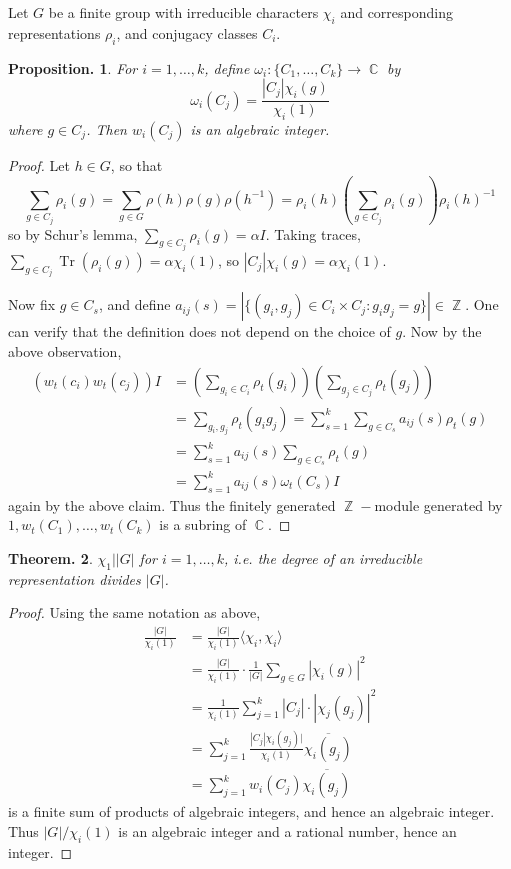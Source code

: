 \documentclass[11pt, a4paper]{memoir}
\DeclareMathOperator{\Z}{{\mathbb{Z}}}
\DeclareMathOperator{\C}{{\mathbb{C}}}
\theoremstyle{change}
\newtheorem{theorem}{Theorem.}[section]
\newtheorem{proposition}[theorem]{Proposition.}
\theoremstyle{plain}
\theoremstyle{nonumberplain}
\newtheorem{proof}{Proof}
\DeclareMathOperator{\Tr}{Tr}
\numberwithin{equation}{section}
\begin{document}
Let $G$ be a finite group with irreducible characters $\chi_i$ and corresponding representations $\rho_i$, and conjugacy classes $C_i$.
\begin{proposition}
    For $i=1,\ldots,k$, define $\omega_i:\{C_1,\ldots,C_k\}\to\C$ by
    \begin{equation*}
        \omega_i(C_j)=\frac{|C_j|\chi_i(g)}{\chi_i(1)}
    \end{equation*}
    where $g\in C_j$.
    Then $w_i(C_j)$ is an algebraic integer.
\end{proposition}
\begin{proof}
    Let $h\in G$, so that
    \begin{equation*}
        \sum_{g\in C_j}\rho_i(g)=\sum_{g\in G}\rho(h)\rho(g)\rho(h^{-1})=\rho_i(h)\left(\sum_{g\in C_j}\rho_i(g)\right)\rho_i(h)^{-1}
    \end{equation*}
    so by Schur's lemma, $\sum_{g\in C_j}\rho_i(g)=\alpha I$.
    Taking traces, $\sum_{g\in C_j}\Tr(\rho_i(g))=\alpha\chi_i(1)$, so $|C_j|\chi_i(g)=\alpha\chi_i(1)$.

    Now fix $g\in C_s$, and define $a_{ij}(s)=|\{(g_i,g_j)\in C_i\times C_j:g_ig_j=g\}|\in\Z$.
    One can verify that the definition does not depend on the choice of $g$.
    Now by the above observation,
    \begin{align*}
        (w_t(c_i)w_t(c_j))I&=\left(\sum_{g_i\in C_i}\rho_t(g_i)\right)\left(\sum_{g_j\in C_j}\rho_t(g_j)\right)\\
                           &=\sum_{g_i,g_j}\rho_t(g_ig_j)=\sum_{s=1}^k\sum_{g\in C_s}a_{ij}(s)\rho_t(g)\\
                           &= \sum_{s=1}^k a_{ij}(s)\sum_{g\in C_s}\rho_t(g)\\
                           &=\sum_{s=1}^k a_{ij}(s)\omega_t(C_s)I
    \end{align*}
    again by the above claim.
    Thus the finitely generated $\Z-$module generated by $1,w_t(C_1),\ldots,w_t(C_k)$ is a subring of $\C$.
\end{proof}
\begin{theorem}
    $\chi_1||G|$ for $i=1,\ldots,k$, i.e. the degree of an irreducible representation divides $|G|$.
\end{theorem}
\begin{proof}
    Using the same notation as above,
    \begin{align*}
        \frac{|G|}{\chi_i(1)}&=\frac{|G|}{\chi_i(1)}\langle\chi_i,\chi_i\rangle\\
                             &= \frac{|G|}{\chi_i(1)}\cdot\frac{1}{|G|}\sum_{g\in G}|\chi_i(g)|^2\\
                             &= \frac{1}{\chi_i(1)}\sum_{j=1}^k|C_j|\cdot|\chi_j(g_j)|^2\\
                             &= \sum_{j=1}^k\frac{|C_j|\chi_i(g_j)|}{\chi_i(1)}\overline{\chi_i(g_j)}\\
                             &= \sum_{j=1}^k w_i(C_j)\overline{\chi_i(g_j)}
    \end{align*}
    is a finite sum of products of algebraic integers, and hence an algebraic integer.
    Thus $|G|/\chi_i(1)$ is an algebraic integer and a rational number, hence an integer.
\end{proof}
\end{document}
